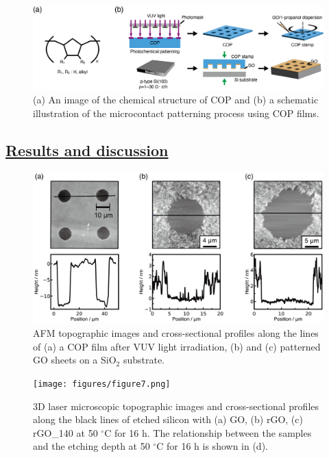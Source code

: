 \documentclass[platex,dvipdfmx]{jlreq}			%
\begin{document}
\begin{figure}[H]
    \centering
    \includegraphics[width=120mm]{figures/figure5.png}
    \caption{(a) An image of the chemical structure of COP and (b) a schematic illustration of the microcontact patterning process using COP films.}
    \label{fig:COP}
\end{figure}

\subsection*{\ul{Results and discussion}}

\begin{figure}[H]
    \centering
    \includegraphics[width=150mm]{figures/figure6.png}
    \caption{AFM topographic images and cross-sectional profiles along the lines of (a) a COP film after VUV light irradiation, (b) and (c) patterned GO sheets on a SiO$_2$ substrate.}
    \label{fig:COP_AFM}
\end{figure}

\begin{figure}[H]
    \centering
    \texttt{[image: figures/figure7.png]}
    \caption{3D laser microscopic topographic images and cross-sectional profiles along the black lines of etched silicon with (a) GO, (b) rGO, (c) rGO\_140 at 50 ${}^\circ$C for 16 h. The relationship between the samples and the etching depth at 50 ${}^\circ$C for 16 h is shown in (d).}
    \label{fig:Laser}
\end{figure}
\end{document}
